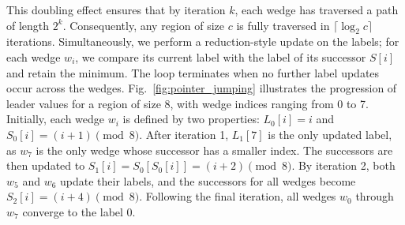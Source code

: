 \documentclass[conference]{IEEEtran}
\begin{document}
\begin{enumerate}
    This doubling effect ensures that by iteration $k$, each wedge has traversed a path of length $2^k$. Consequently, any region of size $c$ is fully traversed in $\lceil \log_2 c \rceil$ iterations. Simultaneously, we perform a reduction-style update on the labels; for each wedge $w_i$, we compare its current label with the label of its successor $S[i]$ and retain the minimum. The loop terminates when no further label updates occur across the wedges. Fig.~\ref{fig:pointer_jumping} illustrates the progression of leader values for a region of size 8, with wedge indices ranging from 0 to 7. Initially, each wedge $w_i$ is defined by two properties: $L_0[i] = i$ and $S_0[i] = (i + 1) \pmod{8}$. After iteration 1, $L_1[7]$ is the only updated label, as $w_7$ is the only wedge whose successor has a smaller index. The successors are then updated to $S_1[i] = S_0[S_0[i]] = (i + 2) \pmod{8}$. By iteration 2, both $w_5$ and $w_6$ update their labels, and the successors for all wedges become $S_2[i] = (i + 4) \pmod{8}$. Following the final iteration, all wedges $w_0$ through $w_7$ converge to the label 0.



\end{enumerate}
\end{document}
